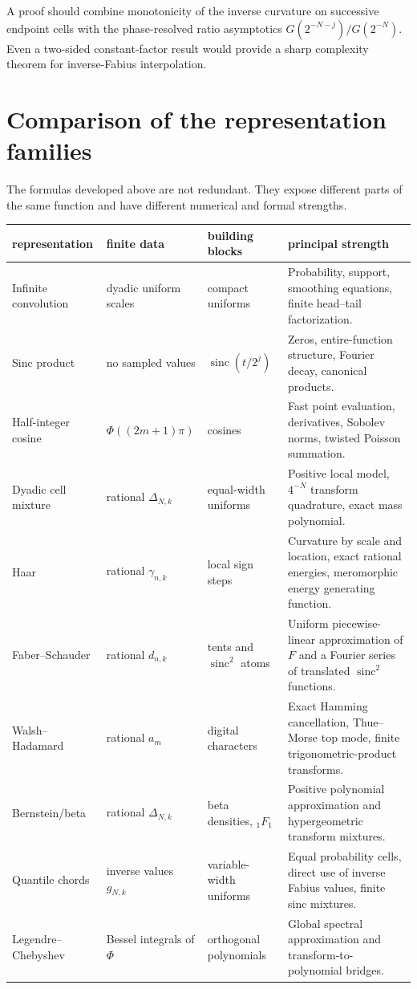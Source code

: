 \documentclass[11pt,oneside]{article}
\theoremstyle{definition}
\theoremstyle{remark}
\newcommand{\sinc}{\operatorname{sinc}}
\begin{document}
A proof should combine monotonicity of the inverse curvature on successive
endpoint cells with the phase-resolved ratio asymptotics
$G(2^{-N-j})/G(2^{-N})$.  Even a two-sided constant-factor result would provide
a sharp complexity theorem for inverse-Fabius interpolation.

\section{Comparison of the representation families}
\label{sec:comparison}

The formulas developed above are not redundant.  They expose different parts
of the same function and have different numerical and formal strengths.

\begin{longtable}{@{}p{}p{}p{}p{}@{}}
\toprule
representation & finite data & building blocks & principal strength\\
\midrule
\endhead
Infinite convolution & dyadic uniform scales & compact uniforms & Probability,
support, smoothing equations, finite head--tail factorization.\\
Sinc product & no sampled values & $\sinc(t/2^j)$ & Zeros, entire-function
structure, Fourier decay, canonical products.\\
Half-integer cosine & $\Phi((2m+1)\pi)$ & cosines & Fast point evaluation,
derivatives, Sobolev norms, twisted Poisson summation.\\
Dyadic cell mixture & rational $\Delta_{N,k}$ & equal-width uniforms & Positive
local model, $4^{-N}$ transform quadrature, exact mass polynomial.\\
Haar & rational $\gamma_{n,k}$ & local sign steps & Curvature by scale and
location, exact rational energies, meromorphic energy generating function.\\
Faber--Schauder & rational $d_{n,k}$ & tents and $\sinc^2$ atoms & Uniform
piecewise-linear approximation of $F$ and a Fourier series of translated
$\sinc^2$ functions.\\
Walsh--Hadamard & rational $a_m$ & digital characters & Exact Hamming
cancellation, Thue--Morse top mode, finite trigonometric-product transforms.\\
Bernstein/beta & rational $\Delta_{N,k}$ & beta densities, ${}_1F_1$ & Positive
polynomial approximation and hypergeometric transform mixtures.\\
Quantile chords & inverse values $g_{N,k}$ & variable-width uniforms & Equal
probability cells, direct use of inverse Fabius values, finite sinc mixtures.\\
Legendre--Chebyshev & Bessel integrals of $\Phi$ & orthogonal polynomials &
Global spectral approximation and transform-to-polynomial bridges.\\
\bottomrule
\end{longtable}
\end{document}
